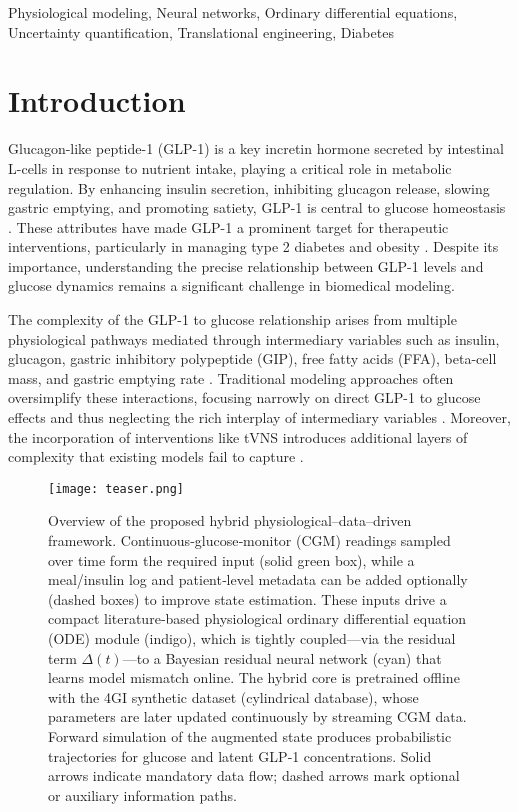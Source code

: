 \documentclass[9pt,shortpaper,twoside,web]{ieeecolor}
\begin{document}
\begin{IEEEkeywords}
Physiological modeling, Neural networks, Ordinary differential equations, Uncertainty quantification, Translational engineering, Diabetes
\end{IEEEkeywords}

\section{Introduction}

Glucagon-like peptide-1 (GLP-1) is a key incretin hormone secreted by intestinal L-cells in response to nutrient intake, playing a critical role in metabolic regulation. By enhancing insulin secretion, inhibiting glucagon release, slowing gastric emptying, and promoting satiety, GLP-1 is central to glucose homeostasis \cite{holst2007incretins, wang2024glp1, shaohormone2024}. These attributes have made GLP-1 a prominent target for therapeutic interventions, particularly in managing type 2 diabetes and obesity \cite{mingrone2024obesity, vezza2024advantages}. Despite its importance, understanding the precise relationship between GLP-1 levels and glucose dynamics remains a significant challenge in biomedical modeling.

The complexity of the GLP-1 to glucose relationship arises from multiple physiological pathways mediated through intermediary variables such as insulin, glucagon, gastric inhibitory polypeptide (GIP), free fatty acids (FFA), beta-cell mass, and gastric emptying rate \cite{mingrone2024obesity, griffin2024acsL5}. Traditional modeling approaches often oversimplify these interactions, focusing narrowly on direct GLP-1 to glucose effects and thus neglecting the rich interplay of intermediary variables \cite{shaohormone2024, chiriac2024dualagonists}. Moreover, the incorporation of interventions like tVNS introduces additional layers of complexity that existing models fail to capture \cite{poon2024betacells, moroni2024gcapeptide}.

\begin{figure}
    \centering
    \texttt{[image: teaser.png]}
    \caption{Overview of the proposed hybrid physiological–data–driven framework. Continuous‐glucose‐monitor (CGM) readings sampled over time form the required input (solid green box), while a meal/insulin log and patient‐level metadata can be added optionally (dashed boxes) to improve state estimation. These inputs drive a compact literature‐based physiological ordinary differential equation (ODE) module (indigo), which is tightly coupled—via the residual term $\Delta(t)$—to a Bayesian residual neural network (cyan) that learns model mismatch online. The hybrid core is pretrained offline with the 4GI synthetic dataset (cylindrical database), whose parameters are later updated continuously by streaming CGM data. Forward simulation of the augmented state produces probabilistic trajectories for glucose and latent GLP‐1 concentrations. Solid arrows indicate mandatory data flow; dashed arrows mark optional or auxiliary information paths.}
    \label{fig:glp1_injection_guidance}
\end{figure}
\end{document}
